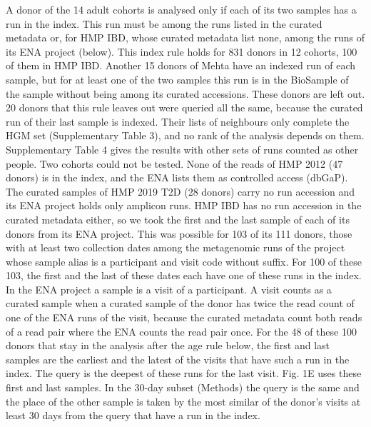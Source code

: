 \documentclass[11pt,a4paper]{article}
\begin{document}
A donor of the 14 adult cohorts is analysed only if each of its two samples has a run in the index. This run must be among the runs listed in the curated metadata or, for HMP IBD, whose curated metadata list none, among the runs of its ENA project (below). This index rule holds for 831 donors in 12 cohorts, 100 of them in HMP IBD. Another 15 donors of Mehta have an indexed run of each sample, but for at least one of the two samples this run is in the BioSample of the sample without being among its curated accessions. These donors are left out. 20 donors that this rule leaves out were queried all the same, because the curated run of their last sample is indexed. Their lists of neighbours only complete the HGM set (Supplementary Table 3), and no rank of the analysis depends on them. Supplementary Table 4 gives the results with other sets of runs counted as other people. Two cohorts could not be tested. None of the reads of HMP 2012 (47 donors) is in the index, and the ENA lists them as controlled access (dbGaP). The curated samples of HMP 2019 T2D (28 donors) carry no run accession and its ENA project holds only amplicon runs. HMP IBD has no run accession in the curated metadata either, so we took the first and the last sample of each of its donors from its ENA project. This was possible for 103 of its 111 donors, those with at least two collection dates among the metagenomic runs of the project whose sample alias is a participant and visit code without suffix. For 100 of these 103, the first and the last of these dates each have one of these runs in the index. In the ENA project a sample is a visit of a participant. A visit counts as a curated sample when a curated sample of the donor has twice the read count of one of the ENA runs of the visit, because the curated metadata count both reads of a read pair where the ENA counts the read pair once. For the 48 of these 100 donors that stay in the analysis after the age rule below, the first and last samples are the earliest and the latest of the visits that have such a run in the index. The query is the deepest of these runs for the last visit. Fig. 1E uses these first and last samples. In the 30-day subset (Methods) the query is the same and the place of the other sample is taken by the most similar of the donor's visits at least 30 days from the query that have a run in the index.
\end{document}
